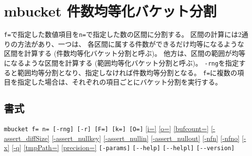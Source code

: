 
%

\section{mbucket 件数均等化バケット分割\label{sect:mbucket}}
\verb|f=|で指定した数値項目を\verb|n=|で指定した数の区間に分割する。
区間の計算には2通りの方法があり、一つは、
各区間に属する件数ができるだけ均等になるような区間を計算する
(件数均等化バケット分割と呼ぶ)。
他方は、区間の範囲が均等になるような区間を計算する
(範囲均等化バケット分割と呼ぶ)。
\verb|-rng|を指定すると範囲均等分割となり、指定しなければ件数均等分割となる。
\verb|f=|に複数の項目を指定した場合は、それぞれの項目ごとにバケット分割を実行する。

\subsection*{書式}
\verb|mbucket f= n= [-rng] [-r] [F=] [k=] [O=]| 
\hyperref[sect:option_i]{[i=]}
\hyperref[sect:option_o]{[o=]}
\hyperref[sect:option_bufcount]{[bufcount=]} 
\hyperref[sect:option_assert_diffSize]{[-assert\_diffSize]}
\hyperref[sect:option_assert_nullkey]{[-assert\_nullkey]}
\hyperref[sect:option_assert_nullin]{[-assert\_nullin]}
\hyperref[sect:option_assert_nullout]{[-assert\_nullout]}
\hyperref[sect:option_nfn]{[-nfn]} 
\hyperref[sect:option_nfno]{[-nfno]}  
\hyperref[sect:option_x]{[-x]}
\hyperref[sect:option_q]{[-q]}
\hyperref[sect:option_option_tmppath]{[tmpPath=]}
\hyperref[sect:option_precision]{[precision=]}
\verb|[-params]|
\verb|[--help]|
\verb|[--helpl]|
\verb|[--version]|\\

